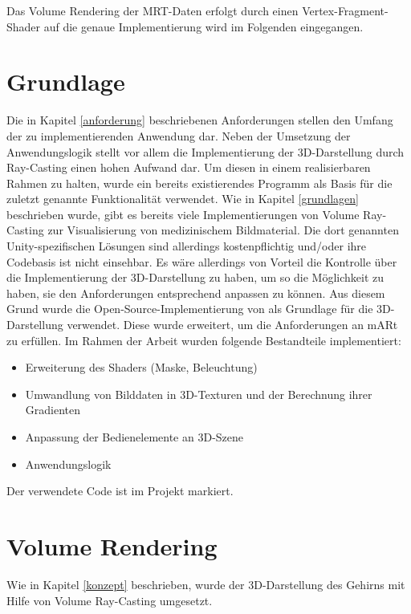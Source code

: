 Das Volume Rendering der MRT-Daten erfolgt durch einen Vertex-Fragment-Shader auf die genaue Implementierung wird im Folgenden eingegangen. 

\section{Grundlage}

Die in Kapitel \ref{anforderung} beschriebenen Anforderungen stellen den Umfang der zu implementierenden Anwendung dar. 
Neben der Umsetzung der Anwendungslogik stellt vor allem die Implementierung der 3D-Darstellung durch Ray-Casting einen hohen Aufwand dar. Um diesen in einem realisierbaren Rahmen zu halten, wurde ein bereits existierendes Programm als Basis für die zuletzt genannte Funktionalität verwendet.
Wie in Kapitel \ref{grundlagen} beschrieben wurde, gibt es bereits viele Implementierungen von Volume Ray-Casting zur Visualisierung von medizinischem Bildmaterial. 
Die dort genannten Unity-spezifischen Lösungen sind allerdings kostenpflichtig und/oder ihre Codebasis ist nicht einsehbar. Es wäre allerdings von Vorteil die Kontrolle über die Implementierung der 3D-Darstellung zu haben, um so die Möglichkeit zu haben, sie den Anforderungen entsprechend anpassen zu können.
Aus diesem Grund wurde die Open-Source-Implementierung von \cite{volumeRenderingGit} als Grundlage für die 3D-Darstellung verwendet. 
Diese wurde erweitert, um die Anforderungen an mARt zu erfüllen. 
Im Rahmen der Arbeit wurden folgende Bestandteile implementiert:

\begin{itemize}
\item Erweiterung des Shaders (Maske, Beleuchtung)
\item Umwandlung von Bilddaten in 3D-Texturen und der Berechnung ihrer Gradienten
\item Anpassung der Bedienelemente an 3D-Szene
\item Anwendungslogik
\end{itemize}
Der verwendete Code ist im Projekt markiert.
\section{Volume Rendering}

Wie in Kapitel \ref{konzept} beschrieben, wurde der 3D-Darstellung des Gehirns mit Hilfe von Volume Ray-Casting umgesetzt. 

